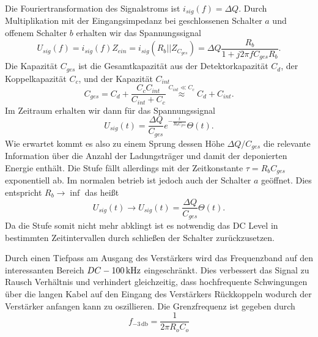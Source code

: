 Die Fouriertransformation des Signalstroms ist $i_{sig}(f)=\Delta Q$.
Durch Multiplikation mit der Eingangsimpedanz bei geschlossenen Schalter $a$ und offenem Schalter $b$ erhalten wir das Spannungssignal
\begin{equation}
U_{sig}(f) = i_{sig}(f)Z_{ein} = i_{sig}(R_b||Z_{C_{ges}}) = \Delta Q \frac{R_b}{1 + j2\pi f C_{ges}R_b}.
\label{eq:InitialSig}
\end{equation}
Die Kapazität $C_{ges}$ ist die Gesamtkapazität aus der Detektorkapazität $C_d$, der Koppelkapazität $C_c$, und der Kapazität $C_{int}$ 
\begin{equation}
C_{ges} = C_d + \frac{C_cC_{int}}{C_{int} + C_c} \stackrel{C_{int} \ll C_c}{\approx} C_d + C_{int}.
\end{equation}
Im Zeitraum erhalten wir dann für das Spannungssignal
\begin{equation}
U_{sig}(t) = \frac{\Delta Q}{C_{ges}}e^{-\frac{t}{R_bC_{ges}}}\Theta(t).
\end{equation}
Wie erwartet kommt es also zu einem Sprung dessen Höhe $\Delta Q/C_{ges}$ die relevante Information über die Anzahl der Ladungsträger und damit der deponierten Energie enthält.
Die Stufe fällt allerdings mit der Zeitkonstante $\tau=R_bC_{ges}$ exponentiell ab.
Im normalen betrieb ist jedoch auch der Schalter $a$ geöffnet.
Dies entspricht $R_b\rightarrow\inf$ das heißt
\begin{equation}
U_{sig}(t)\rightarrow U_{sig}(t)=\frac{\Delta Q}{C_{ges}}\Theta(t).
\end{equation}
Da die Stufe somit nicht mehr abklingt ist es notwendig das DC Level in bestimmten Zeitintervallen durch schließen der Schalter zurückzusetzen.

Durch einen Tiefpass am Ausgang des Verstärkers wird das Frequenzband auf den interessanten Bereich $DC \-- \SI{100}{\kilo\hertz}$ eingeschränkt.
Dies verbessert das Signal zu Rausch Verhältnis und verhindert gleichzeitig, dass hochfrequente Schwingungen über die langen Kabel auf den Eingang des Verstärkers Rückkoppeln wodurch der Verstärker anfangen kann zu oszillieren.
Die Grenzfrequenz ist gegeben durch 
\begin{equation}
f_{-3\,\mathrm{db}} = \frac{1}{2\pi R_o C_o}
\end{equation}

